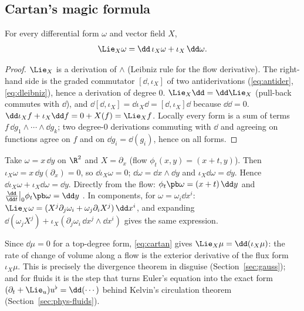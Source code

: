 \subsection{Cartan's magic formula}\label{sec:cartan}

\begin{theorem}[Cartan]\label{thm:cartan}
For every differential form $\omega$ and vector field $X$,
\begin{equation}\label{eq:cartan}
\Lie_X\omega=\dd\,\iota_X\omega+\iota_X\,\dd\omega .
\end{equation}
\end{theorem}
\begin{proof}
 $\Lie_X$ is a derivation of $\wedge$ (Leibniz rule for the flow derivative). The right-hand side is the graded commutator $[\dd,\iota_X]$ of two antiderivations (\eqref{eq:antider}, \eqref{eq:dleibniz}), hence a derivation of degree $0$.
 $\Lie_X\dd=\dd\Lie_X$ (pull-back commutes with $\dd$), and $\dd[\dd,\iota_X]=\dd\iota_X\dd=[\dd,\iota_X]\dd$ because $\dd\dd=0$.
 $\dd\iota_Xf+\iota_X\dd f=0+X(f)=\Lie_Xf$.
 Locally every form is a sum of terms $f\,\dd g_1\wedge\cdots\wedge\dd g_k$; two degree-$0$ derivations commuting with $\dd$ and agreeing on functions agree on $f$ and on $\dd g_i=\dd(g_i)$, hence on all forms.
\end{proof}

\begin{example}\label{ex:cartan1}
Take $\omega=x\,\dd y$ on $\R^2$ and $X=\partial_x$ (flow $\phi_t(x,y)=(x+t,y)$). Then $\iota_X\omega=x\,\dd y(\partial_x)=0$, so $\dd\iota_X\omega=0$; $\dd\omega=\dd x\wedge\dd y$ and $\iota_X\dd\omega=\dd y$. Hence $\dd\iota_X\omega+\iota_X\dd\omega=\dd y$.
Directly from the flow: $\phi_t\pb\omega=(x+t)\,\dd y$ and $\frac{\dd}{\dd t}\big|_0\phi_t\pb\omega=\dd y$ \checkmark.
In components, for $\omega=\omega_i\dd x^i$: $\Lie_X\omega=(X^j\partial_j\omega_i+\omega_j\partial_iX^j)\,\dd x^i$, and expanding $\dd(\omega_jX^j)+\iota_X(\partial_j\omega_i\,\dd x^j\wedge\dd x^i)$ gives the same expression.
\end{example}

\begin{remark}
Since $\dd\mu=0$ for a top-degree form, \eqref{eq:cartan} gives $\Lie_X\mu=\dd(\iota_X\mu)$: the rate of change of volume along a flow is the exterior derivative of the flux form $\iota_X\mu$. This is precisely the divergence theorem in disguise (Section~\ref{sec:gauss}); and for fluids it is the step that turns Euler's equation into the exact form $(\partial_t+\Lie_u)u^\flat=\dd(\cdots)$ behind Kelvin's circulation theorem (Section~\ref{sec:phys-fluids}).
\end{remark}
